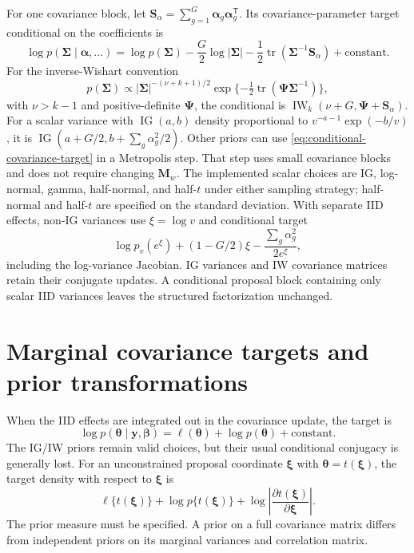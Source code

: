 \documentclass[11pt]{article}
\newcommand{\by}{\bm{y}}
\newcommand{\balpha}{\bm{\alpha}}
\newcommand{\bbeta}{\bm{\beta}}
\newcommand{\btheta}{\bm{\theta}}
\newcommand{\bxi}{\bm{\xi}}
\newcommand{\bM}{\bm{M}}
\newcommand{\bS}{\bm{S}}
\newcommand{\bSigma}{\bm{\Sigma}}
\newcommand{\trans}{^{\mathsf T}}
\DeclareMathOperator{\tr}{tr}
\begin{document}
For one covariance block, let $\bS_\alpha=\sum_{g=1}^G\balpha_g\balpha_g\trans$.
Its covariance-parameter target conditional on the coefficients is
\begin{equation}\label{eq:conditional-covariance-target}
 \log p(\bSigma\mid\balpha,\ldots)
 =\log p(\bSigma)-\frac G2\log|\bSigma|
 -\frac12\tr(\bSigma^{-1}\bS_\alpha)+\mathrm{constant}.
\end{equation}
For the inverse-Wishart convention
\begin{equation}
 p(\bSigma)\propto |\bSigma|^{-(\nu+k+1)/2}
 \exp\{-\tfrac12\tr(\bm{\Psi}\bSigma^{-1})\},
\end{equation}
with $\nu>k-1$ and positive-definite $\bm{\Psi}$, the conditional is
$\operatorname{IW}_k(\nu+G,\bm{\Psi}+\bS_\alpha)$.
For a scalar variance with $\operatorname{IG}(a,b)$ density proportional to
$v^{-a-1}\exp(-b/v)$, it is
$\operatorname{IG}(a+G/2,b+\sum_g\alpha_g^2/2)$.
Other priors can use \eqref{eq:conditional-covariance-target} in a Metropolis step.
That step uses small covariance blocks and does not require changing $\bM_w$.
The implemented scalar choices are IG, log-normal, gamma, half-normal, and
half-$t$ under either sampling strategy; half-normal and half-$t$ are specified
on the standard deviation. With separate IID effects, non-IG variances use
$\xi=\log v$ and conditional target
\begin{equation}
 \log p_v(e^\xi)+(1-G/2)\xi-\frac{\sum_g\alpha_g^2}{2e^\xi},
\end{equation}
including the log-variance Jacobian. IG variances and IW covariance matrices
retain their conjugate updates. A conditional proposal block containing only
scalar IID variances leaves the structured factorization unchanged.

\section{Marginal covariance targets and prior transformations}
When the IID effects are integrated out in the covariance update, the target is
\begin{equation}\label{eq:marginal-target}
 \log p(\btheta\mid\by,\bbeta)=\ell(\btheta)+\log p(\btheta)+\mathrm{constant}.
\end{equation}
The IG/IW priors remain valid choices, but their usual conditional conjugacy is
generally lost. For an unconstrained proposal coordinate $\bxi$ with
$\btheta=t(\bxi)$, the target density with respect to $\bxi$ is
\begin{equation}
 \ell\{t(\bxi)\}+\log p\{t(\bxi)\}
 +\log\left|\frac{\partial t(\bxi)}{\partial\bxi}\right|.
\end{equation}
The prior measure must be specified. A prior on a full covariance matrix differs
from independent priors on its marginal variances and correlation matrix.
\end{document}
